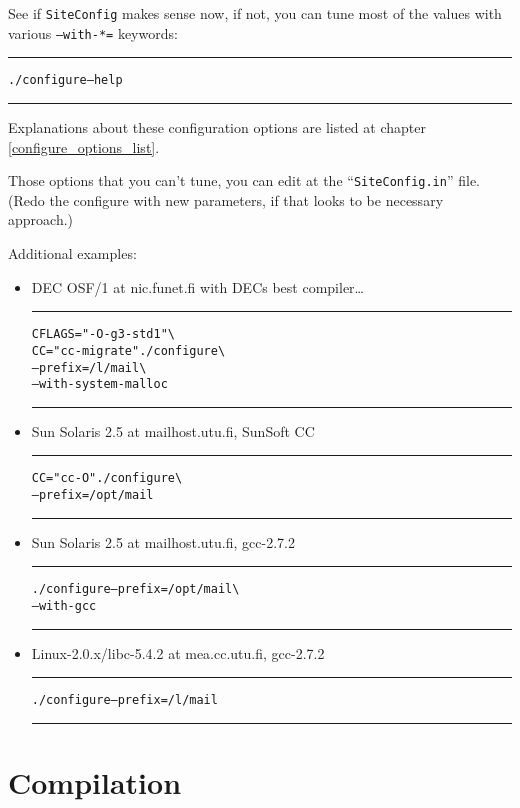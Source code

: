 See if {\tt SiteConfig} makes sense now, if not, you can tune
most of the values with various {\tt --with-*=} keywords:
\nopagebreak%
\begin{alltt}\medskip\hrule\medskip
  ./configure --help
\medskip\hrule\end{alltt}\medskip
\nopagebreak\par
Explanations about these configuration options are listed
at chapter \vref{configure_options_list}.

Those options that you can't tune, you can edit at
the ``{\tt SiteConfig.in}'' file.
(Redo the configure with new parameters, if that looks
 to be necessary approach.)

Additional examples:
\begin{itemize}
\item DEC OSF/1 at nic.funet.fi with DECs best compiler\ldots

\begin{alltt}\hrule\medskip
CFLAGS="-O -g3 -std1"             \verb/\/
  CC="cc -migrate"  ./configure   \verb/\/
         --prefix=/l/mail         \verb/\/
         --with-system-malloc
\medskip\hrule\medskip\end{alltt}

\item Sun Solaris 2.5  at mailhost.utu.fi, SunSoft CC

\begin{alltt}\hrule\medskip
CC="cc -O" ./configure            \verb/\/
              --prefix=/opt/mail
\medskip\hrule\end{alltt}

\item Sun Solaris 2.5  at mailhost.utu.fi, gcc-2.7.2

\begin{alltt}\hrule\medskip
./configure --prefix=/opt/mail    \verb/\/
       --with-gcc
\medskip\hrule\end{alltt}

\item Linux-2.0.x/libc-5.4.2 at mea.cc.utu.fi, gcc-2.7.2

\begin{alltt}\hrule\medskip
./configure --prefix=/l/mail
\medskip\hrule\end{alltt}
\end{itemize}


\section{Compilation}

